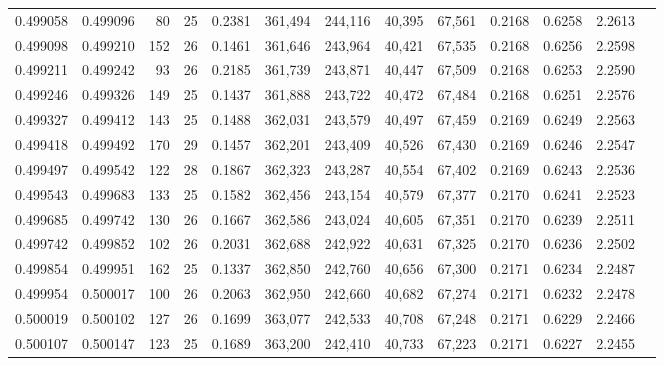 \begin{tabular}{rrrrrrrrrrrrr}
0.499058 & 0.499096 &  80 &  25 &                                     0.2381 & 361,494 & 244,116 &  40,395 &  67,561 & 0.2168 & 0.6258 & 2.2613 \\
0.499098 & 0.499210 & 152 &  26 &                                     0.1461 & 361,646 & 243,964 &  40,421 &  67,535 & 0.2168 & 0.6256 & 2.2598 \\
0.499211 & 0.499242 &  93 &  26 &                                     0.2185 & 361,739 & 243,871 &  40,447 &  67,509 & 0.2168 & 0.6253 & 2.2590 \\
0.499246 & 0.499326 & 149 &  25 &                                     0.1437 & 361,888 & 243,722 &  40,472 &  67,484 & 0.2168 & 0.6251 & 2.2576 \\
0.499327 & 0.499412 & 143 &  25 &                                     0.1488 & 362,031 & 243,579 &  40,497 &  67,459 & 0.2169 & 0.6249 & 2.2563 \\
0.499418 & 0.499492 & 170 &  29 &                                     0.1457 & 362,201 & 243,409 &  40,526 &  67,430 & 0.2169 & 0.6246 & 2.2547 \\
0.499497 & 0.499542 & 122 &  28 &                                     0.1867 & 362,323 & 243,287 &  40,554 &  67,402 & 0.2169 & 0.6243 & 2.2536 \\
0.499543 & 0.499683 & 133 &  25 &                                     0.1582 & 362,456 & 243,154 &  40,579 &  67,377 & 0.2170 & 0.6241 & 2.2523 \\
0.499685 & 0.499742 & 130 &  26 &                                     0.1667 & 362,586 & 243,024 &  40,605 &  67,351 & 0.2170 & 0.6239 & 2.2511 \\
0.499742 & 0.499852 & 102 &  26 &                                     0.2031 & 362,688 & 242,922 &  40,631 &  67,325 & 0.2170 & 0.6236 & 2.2502 \\
0.499854 & 0.499951 & 162 &  25 &                                     0.1337 & 362,850 & 242,760 &  40,656 &  67,300 & 0.2171 & 0.6234 & 2.2487 \\
0.499954 & 0.500017 & 100 &  26 &                                     0.2063 & 362,950 & 242,660 &  40,682 &  67,274 & 0.2171 & 0.6232 & 2.2478 \\
0.500019 & 0.500102 & 127 &  26 &                                     0.1699 & 363,077 & 242,533 &  40,708 &  67,248 & 0.2171 & 0.6229 & 2.2466 \\
0.500107 & 0.500147 & 123 &  25 &                                     0.1689 & 363,200 & 242,410 &  40,733 &  67,223 & 0.2171 & 0.6227 & 2.2455 \\

\end{tabular}

